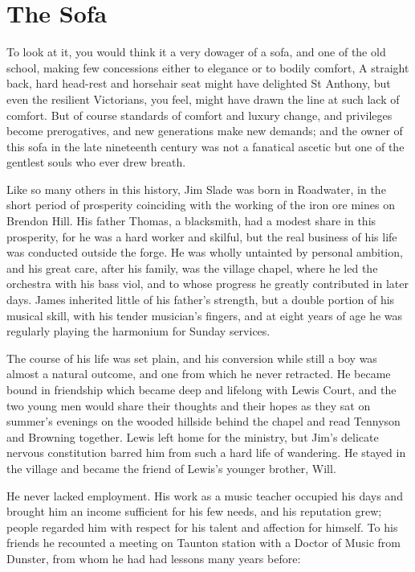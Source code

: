 \section{The Sofa}

To look at it, you would think it a very dowager of a sofa, and one of the old school, making few concessions either to elegance or to bodily comfort, A straight back, hard head-rest and horsehair seat might have delighted St Anthony, but even the resilient Victorians, you feel, might have drawn the line at such lack of comfort. But of course standards of comfort and luxury change, and privileges become prerogatives, and new generations make new demands; and the owner of this sofa in the late nineteenth century was not a fanatical ascetic but one of the gentlest souls who ever drew breath.

Like so many others in this history, Jim Slade was born in Roadwater, in the short period of prosperity coinciding with the working of the iron ore mines on Brendon Hill. His father Thomas, a blacksmith, had a modest share in this prosperity, for he was a hard worker and skilful, but the real business of his life was conducted outside the forge. He was wholly untainted by personal ambition, and his great care, after his family, was the village chapel, where he led the orchestra with his bass viol, and to whose progress he greatly contributed in later days. James inherited little of his father's strength, but a double portion of his musical skill, with his tender musician's fingers, and at eight years of age he was regularly playing the harmonium for Sunday services.

The course of his life was set plain, and his conversion while still a boy was almost a natural outcome, and one from which he never retracted. He became bound in friendship which became deep and lifelong with Lewis Court, and the two young men would share their thoughts and their hopes as they sat on summer's evenings on the wooded hillside behind the chapel and read Tennyson and Browning together. Lewis left home for the ministry, but Jim's delicate nervous constitution barred him from such a hard life of wandering. He stayed in the village and became the friend of Lewis's younger brother, Will.

He never lacked employment. His work as a music teacher occupied his days and brought him an income sufficient for his few needs, and his reputation grew; people regarded him with respect for his talent and affection for himself. To his friends he recounted a meeting on Taunton station with a Doctor of Music from Dunster, from whom he had had lessons many years before: \\


